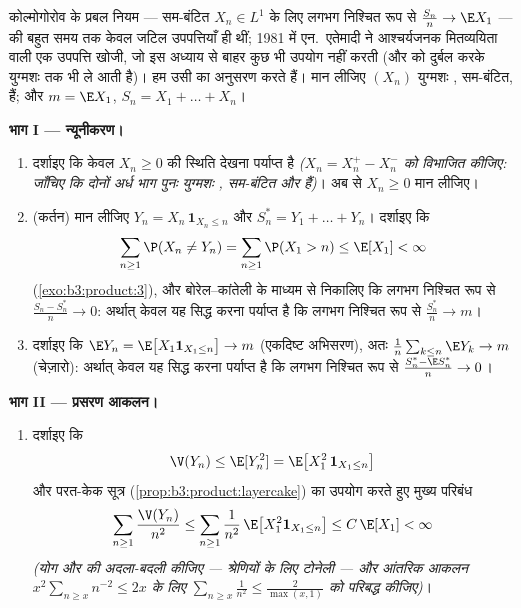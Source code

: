 \begin{problem}
\label{pb:b3:probability:1}
कोल्मोगोरोव के प्रबल नियम ---  सम-बंटित $X_n \in L^1$ के लिए लगभग
निश्चित रूप से $\frac{S_n}n \to \E X_1$ --- की बहुत समय तक केवल जटिल उपपत्तियाँ ही
थीं; 1981 में एन.~एतेमादी ने आश्चर्यजनक मितव्ययिता वाली एक उपपत्ति
खोजी, जो इस अध्याय से बाहर कुछ भी उपयोग नहीं करती (और 
को दुर्बल करके युग्मशः  तक भी ले आती है)। हम उसी का
अनुसरण करते हैं। मान लीजिए $(X_n)$ युग्मशः , सम-बंटित,
 हैं; और $m = \E X_1$, $S_n = X_1 + \dots + X_n$।

\medskip
\noindent\textbf{भाग I --- न्यूनीकरण।}
\begin{enumerate}
  \item दर्शाइए कि केवल $X_n \geq 0$ की स्थिति देखना पर्याप्त है
        \emph{($X_n = X_n^+ - X_n^-$ को विभाजित कीजिए: जाँचिए कि दोनों अर्ध भाग
        पुनः युग्मशः , सम-बंटित और  हैं)}। अब से
        $X_n \geq 0$ मान लीजिए।
  \item (कर्तन) मान लीजिए $Y_n = X_n\,\mathbf 1_{X_n \leq n}$ और $S_n^* = Y_1 + \dots + Y_n$। दर्शाइए कि
        \[
        \sum_{n\geq1}\P(X_n \neq Y_n) =
        \sum_{n\geq1}\P(X_1 > n) \leq \E[X_1] < \infty
        \]
        (\cref{exo:b3:product:3}), और बोरेल--कांतेली के माध्यम से निकालिए कि लगभग
        निश्चित रूप से $\frac{S_n - S_n^*}{n} \to 0$: अर्थात् केवल यह सिद्ध करना पर्याप्त
        है कि लगभग निश्चित रूप से $\frac{S^*_n}n \to m$।
  \item दर्शाइए कि $\E Y_n = \E\bigl[X_1\mathbf 1_{X_1\leq
        n}\bigr] \to m$ (एकदिष्ट अभिसरण), अतः $\frac1n\sum_{k\leq n}\E Y_k \to m$ (चेज़ारो):
        अर्थात् केवल यह सिद्ध करना पर्याप्त है कि लगभग निश्चित
        रूप से $\frac{S_n^* - \E S_n^*}{n} \to 0$।
\end{enumerate}

\medskip
\noindent\textbf{भाग II --- प्रसरण आकलन।}
\begin{enumerate}[resume]
  \item दर्शाइए कि
        \[
        \V(Y_n) \leq \E[Y_n^2] = \E\bigl[X_1^2\,\mathbf
        1_{X_1 \leq n}\bigr]
        \]
        और परत-केक सूत्र (\cref{prop:b3:product:layercake}) का उपयोग करते हुए मुख्य परिबंध
        \[
        \sum_{n\geq1}\frac{\V(Y_n)}{n^2}
        \leq \sum_{n\geq1}\frac1{n^2}\,
        \E\bigl[X_1^2\mathbf 1_{X_1\leq n}\bigr]
        \leq C\,\E[X_1] < \infty
        \]
        \emph{(योग और  की अदला-बदली कीजिए --- श्रेणियों
        के लिए टोनेली --- और आंतरिक आकलन $x^2\sum_{n\geq x}n^{-2} \leq 2x$ के लिए $\sum_{n \geq
        x}\frac1{n^2} \leq \frac2{\max(x,1)}$ को
        परिबद्ध कीजिए)}।
\end{enumerate}


\end{problem}
